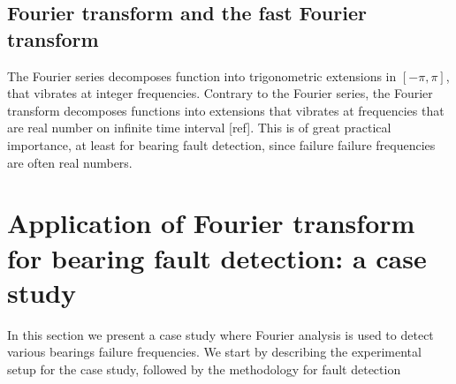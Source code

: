 \documentclass[../Main/thesis.tex]{subfiles}
\begin{document}
\subsection{Fourier transform and the fast Fourier transform}
The Fourier series decomposes function into trigonometric extensions in $[-\pi, \pi]$, that vibrates at integer frequencies. Contrary to the Fourier series, the Fourier transform decomposes functions into extensions that vibrates at frequencies that are real number on infinite time interval [ref]. This is of great practical importance, at least for bearing fault detection, since failure failure frequencies are often real numbers.
\section{Application of Fourier transform for bearing fault detection: a case study}
In this section we present a case study where Fourier analysis is used to detect various bearings failure frequencies. We start by describing the experimental setup for the case study, followed by the methodology for fault detection
\end{document}

